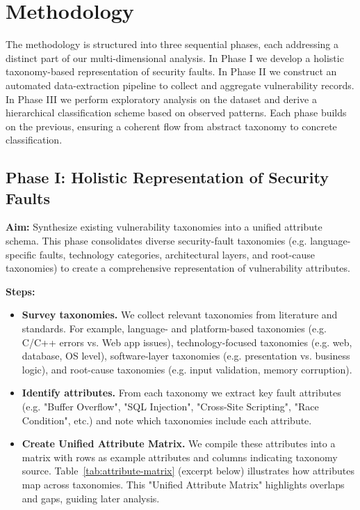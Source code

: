 \section{Methodology} The methodology is structured into three sequential phases, each addressing a distinct part of our multi-dimensional analysis. In Phase I we develop a holistic taxonomy-based representation of security faults. In Phase II we construct an automated data-extraction pipeline to collect and aggregate vulnerability records. In Phase III we perform exploratory analysis on the dataset and derive a hierarchical classification scheme based on observed patterns. Each phase builds on the previous, ensuring a coherent flow from abstract taxonomy to concrete classification.

\subsection{Phase I: Holistic Representation of Security Faults} \textbf{Aim:} Synthesize existing vulnerability taxonomies into a unified attribute schema. This phase consolidates diverse security-fault taxonomies (e.g. language-specific faults, technology categories, architectural layers, and root-cause taxonomies) to create a comprehensive representation of vulnerability attributes.
\newline

\textbf{Steps:}

\begin{itemize}
    \item \textbf{Survey taxonomies.} We collect relevant taxonomies from literature and standards. For example, language- and platform-based taxonomies (e.g. C/C++ errors vs. Web app issues), technology-focused taxonomies (e.g. web, database, OS level), software-layer taxonomies (e.g. presentation vs. business logic), and root-cause taxonomies (e.g. input validation, memory corruption).
    \item \textbf{Identify attributes.} From each taxonomy we extract key fault attributes (e.g. "Buffer Overflow", "SQL Injection", "Cross-Site Scripting", "Race Condition", etc.) and note which taxonomies include each attribute.
    \item \textbf{Create Unified Attribute Matrix.} We compile these attributes into a matrix with rows as example attributes and columns indicating taxonomy source. Table~\ref{tab:attribute-matrix} (excerpt below) illustrates how attributes map across taxonomies. This "Unified Attribute Matrix" highlights overlaps and gaps, guiding later analysis.
\end{itemize}


